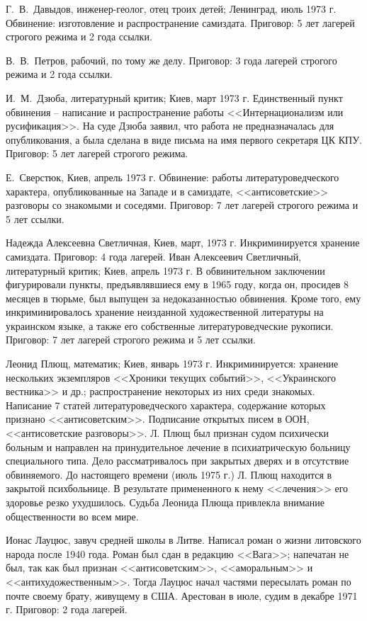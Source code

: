 \documentclass{book}
\begin{document}
Г.~В.~Давыдов, инженер-геолог, отец троих детей; Ленинград, июль 1973 г. Обвинение: изготовление и распространение самиздата. 
Приговор: 5 лет лагерей строгого режима и 2 года ссылки.

В.~В.~Петров, рабочий, по тому же делу. Приговор: 3 года лагерей строгого режима и 2 года ссылки.

И.~М.~Дзюба, литературный критик; Киев, март 1973 г. Единственный пункт обвинения -- написание и распространение ра­боты 
<<Интернационализм или русификация>>. На суде Дзюба заявил, что работа не предназначалась для опубликования, а была сделана в виде 
письма на имя первого секретаря ЦК КПУ. Приговор: 5 лет лагерей строгого режима.

Е.~Сверстюк, Киев, апрель 1973 г. Обвинение: работы литературоведческого характера, опубликованные на Западе и в самиздате, 
<<антисоветские>> разговоры со знакомыми и сосе­дями. Приговор: 7 лет лагерей строгого режима и 5 лет ссылки.

Надежда Алексеевна Светличная, Киев, март, 1973 г. Инкриминируется хранение самиздата. Приговор: 4 года лагерей.
Иван Алексеевич Светличный, литературный критик; Киев, апрель 1973 г. В обвинительном заключении фигурировали пункты, 
предъявлявшиеся ему в 1965 году, когда он, просидев 8 месяцев в тюрьме, был выпущен за недоказанностью обвинения. Кроме того, 
ему инкриминировалось хранение неизданной художественной литературы на украинском языке, а также его собственные 
литературоведческие рукописи. Приговор: 7 лет лагерей строгого режима и 5 лет ссылки.

Леонид Плющ, математик; Киев, январь 1973 г. Инкриминируется: хранение нескольких экземпляров <<Хроники текущих событий>>, <<Украинского вестника>> и др.; распространение некоторых из них среди знакомых. Написание 7 статей литературоведческого характера, содержание которых признано <<антисоветским>>. Подписание открытых писем в ООН, <<антисоветские разговоры>>. Л. Плющ был признан судом психически больным и направлен на принудительное лечение в психиатрическую больницу специального типа. Дело рассматривалось при закрытых дверях и в отсутствие обвиняемого. До настоящего времени (июль 1975 г.) Л. Плющ находится в закрытой психбольнице. В результате примененного к нему <<лечения>> его здоровье резко ухудшилось. Судьба Леонида Плюща привлекла внимание общественности во всем мире.

Ионас Лауцюс, завуч средней школы в Литве. Написал роман о жизни литовского народа после 1940 года. Роман был сдан в редакцию <<Вага>>; напечатан не был, так как был признан <<антисоветским>>, <<аморальным>> и <<антихудожественным>>. Тогда Лауцюс начал частями пересылать роман по почте своему брату, живущему в США. Арестован в июле, судим в декабре 1971 г. Приговор: 2 года лагерей.
\end{document}

